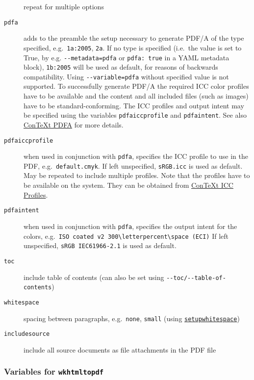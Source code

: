 \begin{description}
repeat for multiple options
\item[\texttt{pdfa}]
adds to the preamble the setup necessary to generate PDF/A of the type
specified, e.g.~\texttt{1a:2005}, \texttt{2a}. If no type is specified
(i.e.~the value is set to True, by e.g. \texttt{-\/-metadata=pdfa} or
\texttt{pdfa:\ true} in a YAML metadata block), \texttt{1b:2005} will be
used as default, for reasons of backwards compatibility. Using
\texttt{-\/-variable=pdfa} without specified value is not supported. To
successfully generate PDF/A the required ICC color profiles have to be
available and the content and all included files (such as images) have
to be standard-conforming. The ICC profiles and output intent may be
specified using the variables \texttt{pdfaiccprofile} and
\texttt{pdfaintent}. See also
\href{https://wiki.contextgarden.net/PDF/A}{ConTeXt PDFA} for more
details.
\item[\texttt{pdfaiccprofile}]
when used in conjunction with \texttt{pdfa}, specifies the ICC profile
to use in the PDF, e.g.~\texttt{default.cmyk}. If left unspecified,
\texttt{sRGB.icc} is used as default. May be repeated to include
multiple profiles. Note that the profiles have to be available on the
system. They can be obtained from
\href{https://wiki.contextgarden.net/PDFX\#ICC_profiles}{ConTeXt ICC
Profiles}.
\item[\texttt{pdfaintent}]
when used in conjunction with \texttt{pdfa}, specifies the output intent
for the colors,
e.g.~\texttt{ISO\ coated\ v2\ 300\textbackslash{}letterpercent\textbackslash{}space\ (ECI)}
If left unspecified, \texttt{sRGB\ IEC61966-2.1} is used as default.
\item[\texttt{toc}]
include table of contents (can also be set using
\texttt{-\/-toc/-\/-table-of-contents})
\item[\texttt{whitespace}]
spacing between paragraphs, e.g.~\texttt{none}, \texttt{small} (using
\href{https://wiki.contextgarden.net/Command/setupwhitespace}{\texttt{setupwhitespace}})
\item[\texttt{includesource}]
include all source documents as file attachments in the PDF file
\end{description}

\hypertarget{variables-for-wkhtmltopdf}{%
\subsubsection{\texorpdfstring{Variables for
\texttt{wkhtmltopdf}}{Variables for wkhtmltopdf}}\label{variables-for-wkhtmltopdf}}

